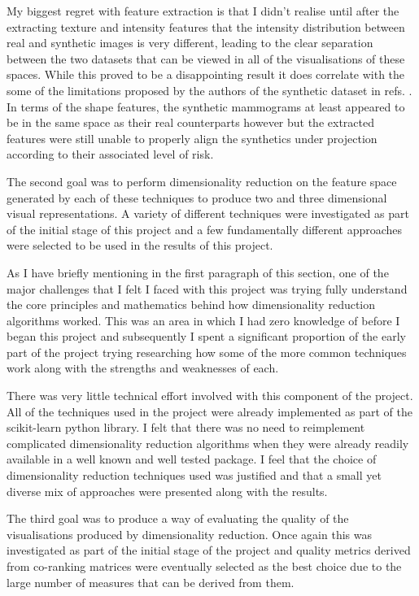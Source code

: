 My biggest regret with feature extraction is that I didn't realise until after the extracting texture and intensity features that the intensity distribution between real and synthetic images is very different, leading to the clear separation between the two datasets that can be viewed in all of the visualisations of these spaces. While this proved to be a disappointing result it does correlate with the some of the limitations proposed by the authors of the synthetic dataset in refs. \cite{bakic2002mammogram1, bakic2002mammogram2, bakic2003mammogram3}. In terms of the shape features, the synthetic mammograms at least appeared to be in the same space as their real counterparts however but the extracted features were still unable to properly align the synthetics under projection according to their associated level of risk.

The second goal was to perform dimensionality reduction on the feature space generated by each of these techniques to produce two and three dimensional visual representations. A variety of different techniques were investigated as part of the initial stage of this project and a few fundamentally different approaches were selected to be used in the results of this project.

As I have briefly mentioning in the first paragraph of this section, one of the major challenges that I felt I faced with this project was trying fully understand the core principles and mathematics behind how dimensionality reduction algorithms worked. This was an area in which I had zero knowledge of before I began this project and subsequently I spent a significant proportion of the early part of the project trying researching how some of the more common techniques work along with the strengths and weaknesses of each. 

There was very little technical effort involved with this component of the project. All of the techniques used in the project were already implemented as part of the scikit-learn python library. I felt that there was no need to reimplement complicated dimensionality reduction algorithms when they were already readily available in a well known and well tested package. I feel that the choice of dimensionality reduction techniques used was justified and that a small yet diverse mix of approaches were presented along with the results.

The third goal was to produce a way of evaluating the quality of the visualisations produced by dimensionality reduction. Once again this was investigated as part of the initial stage of the project and quality metrics derived from co-ranking matrices were eventually selected as the best choice due to the large number of measures that can be derived from them.


